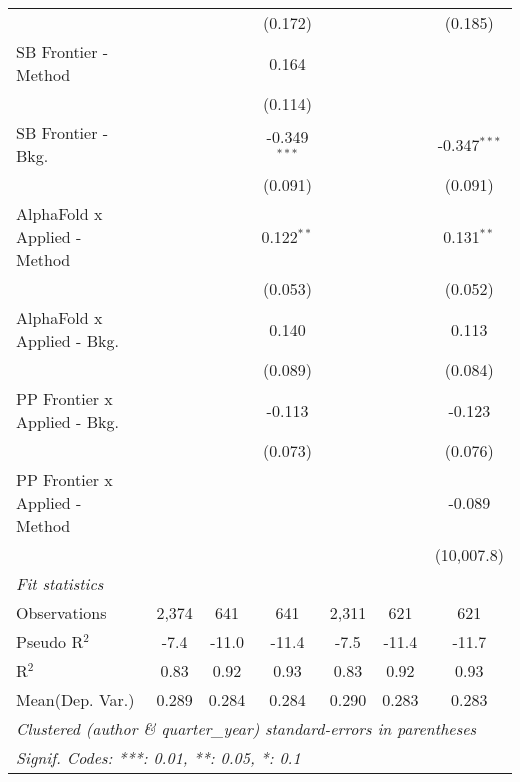\begin{tabular}{lcccccc}
                                  &               &               & (0.172)        &                &                & (0.185)\\   
   SB Frontier - Method           &               &               & 0.164          &                &                &   \\   
                                  &               &               & (0.114)        &                &                &   \\   
   SB Frontier - Bkg.             &               &               & -0.349$^{***}$ &                &                & -0.347$^{***}$\\   
                                  &               &               & (0.091)        &                &                & (0.091)\\   
   AlphaFold x Applied - Method   &               &               & 0.122$^{**}$   &                &                & 0.131$^{**}$\\   
                                  &               &               & (0.053)        &                &                & (0.052)\\   
   AlphaFold x Applied - Bkg.     &               &               & 0.140          &                &                & 0.113\\   
                                  &               &               & (0.089)        &                &                & (0.084)\\   
   PP Frontier x Applied - Bkg.   &               &               & -0.113         &                &                & -0.123\\   
                                  &               &               & (0.073)        &                &                & (0.076)\\   
   PP Frontier x Applied - Method &               &               &                &                &                & -0.089\\   
                                  &               &               &                &                &                & (10,007.8)\\   
   \midrule
   \emph{Fit statistics}\\
   Observations                   & 2,374         & 641           & 641            & 2,311          & 621            & 621\\  
   Pseudo R$^2$                   & -7.4          & -11.0         & -11.4          & -7.5           & -11.4          & -11.7\\  
   R$^2$                          & 0.83          & 0.92          & 0.93           & 0.83           & 0.92           & 0.93\\  
Mean(Dep. Var.) & 0.289 & 0.284 & 0.284 & 0.290 & 0.283 & 0.283 \\
   \midrule \midrule
   \multicolumn{7}{l}{\emph{Clustered (author \& quarter\_year) standard-errors in parentheses}}\\
   \multicolumn{7}{l}{\emph{Signif. Codes: ***: 0.01, **: 0.05, *: 0.1}}\\
\end{tabular}
\par\endgroup
